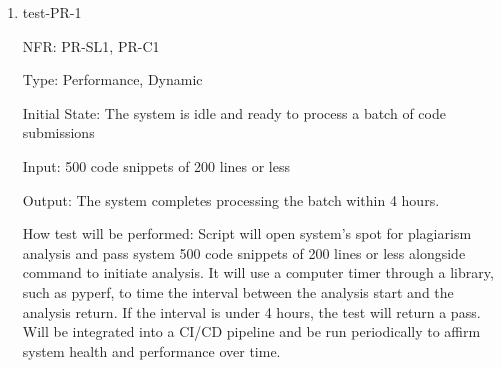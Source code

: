 \documentclass[12pt, titlepage]{article}
\begin{document}
\begin{enumerate}
  \item{test-PR-1}
  
  NFR: PR-SL1, PR-C1

  Type: Performance, Dynamic

  Initial State: The system is idle and ready to process a batch of code submissions

  Input: 500 code snippets of 200 lines or less 

  Output: The system completes processing the batch within 4 hours.

  How test will be performed: Script will open system's spot for plagiarism analysis 
  and pass system 500 code snippets of 200 lines or less alongside command to initiate analysis. 
  It will use a computer timer through a library, such as pyperf, to time the interval between 
  the analysis start and the analysis return. If the interval is under 4 hours, the test will 
  return a pass. Will be integrated into a CI/CD pipeline and be run periodically to affirm 
  system health and performance over time.

\end{enumerate}
\end{document}
